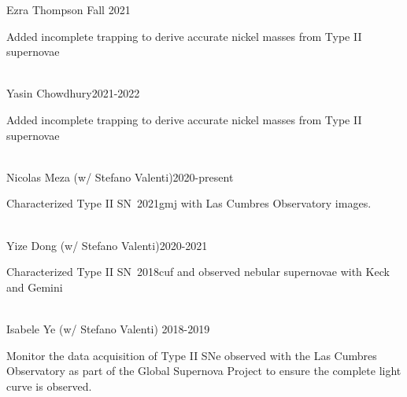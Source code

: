 \documentclass[10pt]{cv}
\begin{document}
\begin{llist}
\vspace{-0.1in}  
Ezra Thompson \hfill Fall 2021\\
\begin{minipage}[l]{0.7\textwidth}\vspace{0.15cm}
Added incomplete trapping to derive accurate nickel masses from Type II supernovae\\
\end{minipage}\vspace{0.15cm}
\\
Yasin Chowdhury\hfill 2021-2022\\
\begin{minipage}[l]{0.7\textwidth}\vspace{0.15cm}
Added incomplete trapping to derive accurate nickel masses from Type II supernovae\\
\end{minipage}\vspace{0.15cm}
\\
Nicolas Meza (w/ Stefano Valenti)\hfill 2020-present\\
\begin{minipage}[l]{0.7\textwidth}\vspace{0.15cm}
Characterized Type II SN~2021gmj with Las Cumbres Observatory images. \\
\end{minipage}\vspace{0.15cm}
\\
Yize Dong (w/ Stefano Valenti)\hfill 2020-2021\\
\begin{minipage}[l]{0.7\textwidth}\vspace{0.15cm}
Characterized Type II SN~2018cuf and observed nebular supernovae with Keck and Gemini\\
\end{minipage}\vspace{0.15cm}
\\
Isabele Ye (w/ Stefano Valenti) \hfill 2018-2019\\
\begin{minipage}[l]{0.7\textwidth}\vspace{0.15cm}
Monitor the data acquisition of Type II SNe observed with the Las Cumbres Observatory as part of the Global Supernova Project to ensure the complete light curve is observed.\\

\end{minipage}
\end{llist}
\end{document}
